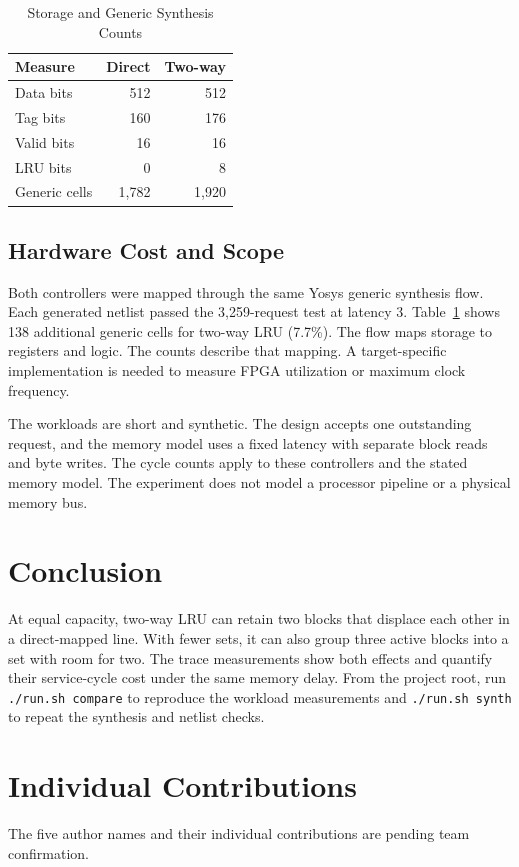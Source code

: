 \begin{table}[!t]
\caption{Storage and Generic Synthesis Counts}
\label{tab:synth}
\centering
\begin{tabular}{lrr}
\toprule
Measure & Direct & Two-way\\
\midrule
Data bits & 512 & 512\\
Tag bits & 160 & 176\\
Valid bits & 16 & 16\\
LRU bits & 0 & 8\\
Generic cells & 1,782 & 1,920\\
\bottomrule
\end{tabular}
\end{table}

\newpage
\subsection{Hardware Cost and Scope}
Both controllers were mapped through the same Yosys generic synthesis
flow. Each generated netlist passed the 3,259-request test at latency 3.
Table~\ref{tab:synth} shows 138 additional generic cells for two-way LRU
(7.7\%). The flow maps storage to registers and logic. The counts
describe that mapping. A target-specific implementation is needed to
measure FPGA utilization or maximum clock frequency.

The workloads are short and synthetic. The design accepts one outstanding
request, and the memory model uses a fixed latency with separate block
reads and byte writes. The cycle counts apply to these controllers
and the stated memory model. The experiment does not model a processor
pipeline or a physical memory bus.

\section{Conclusion}
At equal capacity, two-way LRU can retain two blocks that displace each
other in a direct-mapped line. With fewer sets, it can also group three
active blocks into a set with room for two. The trace measurements show
both effects and quantify their service-cycle cost under the same memory
delay. From the project root, run \texttt{./run.sh compare} to
reproduce the workload measurements and \texttt{./run.sh synth} to
repeat the synthesis and netlist checks.

\section{Individual Contributions}
The five author names and their individual contributions are pending
team confirmation.




